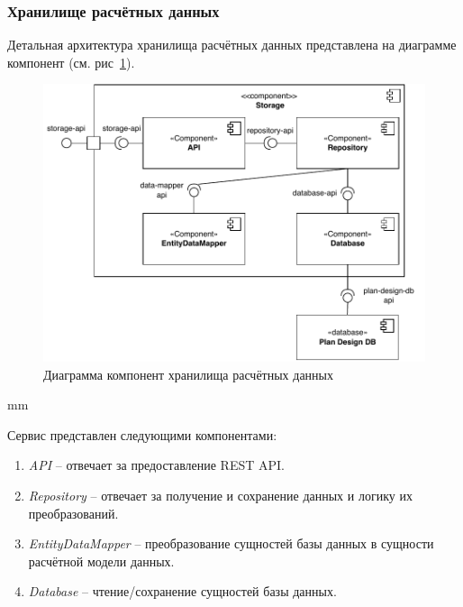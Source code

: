 \subsubsection{\large{Хранилище расчётных данных}}

Детальная архитектура хранилища расчётных данных представлена на диаграмме компонент
(см. рис\ \ref{pic:architecture__storage-component}).

\begin{figure}[H]
	\includegraphics[width=\textwidth]{architecture/pictures/storage/component_common}
	\caption{Диаграмма компонент хранилища расчётных данных}
	\label{pic:architecture__storage-component}
\end{figure}
 mm

Сервис представлен следующими компонентами:
\begin{enumerate}
	\item {
		\textit{API} -- отвечает за предоставление REST API.
	}
	\item {
		\textit{Repository} -- отвечает за получение и сохранение данных и логику их преобразований.
	}
	\item {
		\textit{EntityDataMapper} -- преобразование сущностей базы данных в сущности расчётной модели данных.
	}
	\item {
		\textit{Database} -- чтение/сохранение сущностей базы данных.
	}
\end{enumerate}